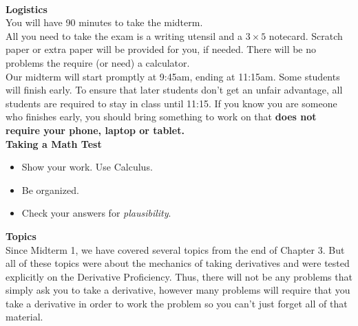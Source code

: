 \documentclass[11pt,fleqn]{article}
\begin{document}
\renewcommand{\headrulewidth}{0pt}
\newcommand{\blank}[1]{\rule{#1}{0.75pt}}
\newcommand{\bc}{\begin{center}}
\newcommand{\ec}{\end{center}}
\renewcommand{\d}{\displaystyle}

\vspace*{-0.7in}

\begin{center}
  \large
  \\
\end{center}
\noindent\textbf{Logistics}\\

You will have 90 minutes to take the midterm. \\

All you need to take the exam is a writing utensil and a $3 \times 5$ notecard. Scratch paper or extra paper will be provided for you, if needed. There will be no problems the require (or need) a calculator. \\

Our midterm will start promptly at 9:45am, ending at 11:15am. Some students will finish early. To ensure that later students don't get an unfair advantage, all students are required to stay in class until 11:15. If you know you are someone who finishes early, you should bring something to work on that \textbf{does not require your phone, laptop or tablet.}\\

\noindent\textbf{Taking a Math Test}

\begin{itemize}
\item Show your work. Use Calculus.
\item Be organized.
\item Check your answers for \emph{plausibility}.
\end{itemize}


\noindent\textbf{Topics}\\

\noindent Since Midterm 1, we have covered several topics from the end of Chapter 3. But all of these topics were about the mechanics of taking derivatives and were tested explicitly on the Derivative Proficiency. Thus, there will not be any problems that simply ask you to take a derivative, however many problems will require that you take a derivative in order to work the problem so you can't just forget all of that material.\\ 
\end{document}
